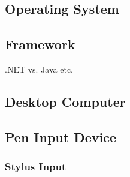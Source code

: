 \subsection{Operating System}
\label{sec:operatingsystem}

\subsection{Framework}
\label{sec:framework}

.NET vs. Java etc.

\subsection{Desktop Computer}
\label{sec:desktopcomputer}

\subsection{Pen Input Device}
\label{sec:peninputdevice}

\subsubsection{Stylus Input}
\label{sec:stylusinput}






